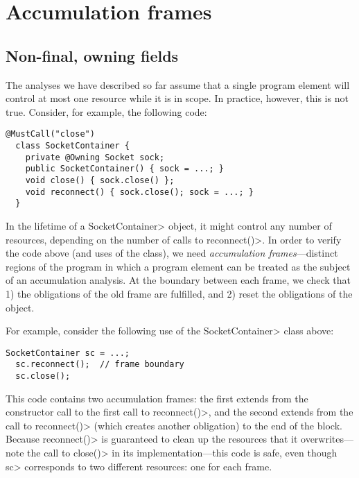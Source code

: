 \section{Accumulation frames}
\label{sec:reset-must-call}

\subsection{Non-final, owning fields}
\label{sec:non-final-owning}

The analyses we have described so far assume that a single program
element will control at most one resource while it is in scope.
In practice, however, this is not true. Consider, for example,
the following code:

\begin{lstlisting}[frame=tb,belowskip=3mm]
  @MustCall("close")
  class SocketContainer {
    private @Owning Socket sock;
    public SocketContainer() { sock = ...; } 
    void close() { sock.close() };
    void reconnect() { sock.close(); sock = ...; }
  }
\end{lstlisting}

In the lifetime of a \<SocketContainer> object, it might control any
number of resources, depending on the number of calls to
\<reconnect()>. In order to verify the code above (and uses of the
class), we need \emph{accumulation frames}---distinct regions of the program in
which a program element can be treated as the subject of an
accumulation analysis. At the boundary between each frame, we check
that 1) the obligations of the old frame are fulfilled, and 2)
reset the obligations of the object.

For example, consider the following use of the \<SocketContainer> class
above:

\begin{lstlisting}[frame=tb,belowskip=3mm]
  SocketContainer sc = ...;
  sc.reconnect();  // frame boundary
  sc.close();
\end{lstlisting}

This code contains two accumulation frames: the first extends from the
constructor call to the first call to \<reconnect()>, and the second
extends from the call to \<reconnect()> (which creates another
obligation) to the end of the block. Because \<reconnect()> is guaranteed
to clean up the resources that it overwrites---note the call
to \<close()> in its implementation---this code is safe, even though \<sc>
corresponds to two different resources: one for each frame.

